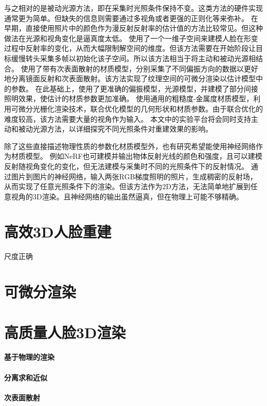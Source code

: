 与之相对的是被动光源方法，即在采集时光照条件保持不变。这类方法的硬件实现通常更为简单。但缺失的信息则需要通过多视角或者更强的正则化等来弥补。
在早期，直接使用照片中的颜色作为漫反射反射率的估计值的方法\citep{BradleyHPS10}比较常见。但这种做法在光源和视角变化是逼真度太低。
\citet{GotardoRBGB18}使用了一个一维子空间来建模人脸在形变过程中反射率的变化，从而大幅限制解空间的维度。但该方法需要在开始阶段让目标缓慢转头采集多帧以初始化该子空间。所以该方法相当于将主动和被动光源相结合。
\citet{RiviereGBGB20}使用了带有次表面散射的材质模型，分别采集了不同偏振方向的数据以更好地分离镜面反射和次表面散射。该方法实现了纹理空间的可微分渲染以估计模型中的参数。
在此基础上，\citet{XuRZCBG22}使用了更准确的偏振模型，光源模型，并建模了部分间接照明效果，使估计的材质参数更加准确。
\citet{nvdiffrec}使用通用的粗糙度-金属度材质模型，利用可微分光栅化渲染技术，联合优化模型的几何形状和材质参数。由于联合优化的难度较高，该方法需要大量的视角作为输入。
本文中的实验平台将会同时支持主动和被动光源方法，以详细探究不同光照条件对重建效果的影响。

除了这些直接描述物理性质的参数化材质模型外，也有研究希望能使用神经网络作为材质模型。
例如NeRF\citep{nerf}也可建模并输出物体反射光线的颜色和强度，且可以建模反射随视角变化的变化，但无法建模与采集时不同的光照条件下的反射情况。
\citet{MekaHPZFFKYBDDB19}通过图片到图片的神经网络，输入两张RGB梯度照明的照片，生成稠密的反射场，从而实现了任意光照条件下的渲染。但该方法作为2D方法，无法简单地扩展到任意视角的3D渲染。且神经网络的输出虽然逼真，但在物理上可能不够精确。

\section{高效3D人脸重建}

尺度正确\citet{ZielonkaBT22}

\section{可微分渲染}

\section{高质量人脸3D渲染}

\paragraph{基于物理的渲染}

\paragraph{分离求和近似}

\paragraph{次表面散射}
